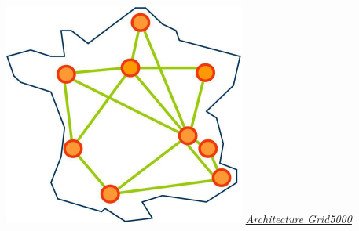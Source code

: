 \documentclass[a4paper,11pt]{report}
\begin{document}
\newpage
\begin{center}
\includegraphics{g5k.png}
\underline{\textit{Architecture Grid5000}}
\end{center}
\end{document}

